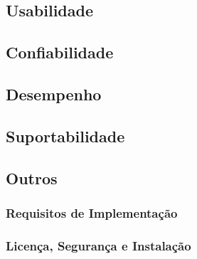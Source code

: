 \subsection{Usabilidade}

\subsection{Confiabilidade}

\subsection{Desempenho}

\subsection{Suportabilidade}

\subsection{Outros}
\subsubsection{Requisitos de Implementação}
\subsubsection{Licença, Segurança e Instalação}